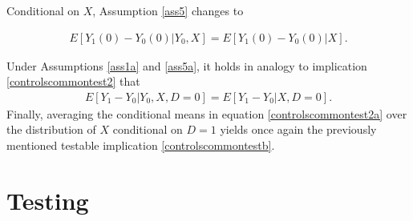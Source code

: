 {	Conditional on $X$, Assumption \ref{ass5} changes to
	\begin{assumption}\label{ass5a}
		\begin{eqnarray*}
			E[Y_1(0)-Y_0(0)|Y_0,X]=E[Y_1(0)-Y_0(0)|X].
		\end{eqnarray*}
	\end{assumption}
	Under Assumptions \ref{ass1a} and \ref{ass5a}, it holds in analogy to implication \eqref{controlscommontest2} that
	\begin{eqnarray}\label{controlscommontest2a}
		E[Y_1-Y_0|Y_0,X,D=0]=E[Y_1-Y_0|X,D=0].
	\end{eqnarray}
	Finally, averaging the conditional means in equation \eqref{controlscommontest2a} over the distribution of $X$ conditional on $D=1$ yields once again the previously mentioned testable implication \eqref{controlscommontestb}.
	
	
	\section{Testing}\label{testapproach}
	
}
